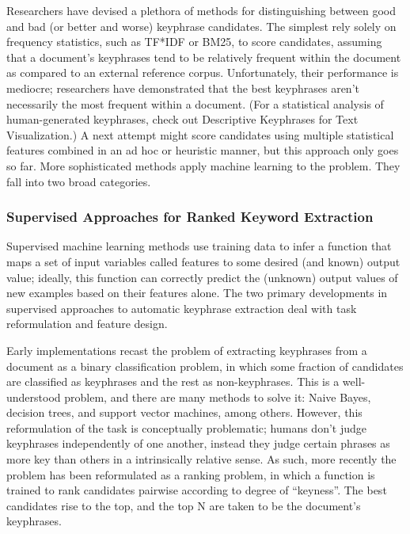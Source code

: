 \documentclass[conference]{IEEEtran}
\begin{document}
Researchers have devised a plethora of methods for distinguishing between good and bad (or better and worse) keyphrase candidates. The simplest rely solely on frequency statistics, such as TF*IDF or BM25, to score candidates, assuming that a document’s keyphrases tend to be relatively frequent within the document as compared to an external reference corpus. Unfortunately, their performance is mediocre; researchers have demonstrated that the best keyphrases aren’t necessarily the most frequent within a document. (For a statistical analysis of human-generated keyphrases, check out Descriptive Keyphrases for Text Visualization.) A next attempt might score candidates using multiple statistical features combined in an ad hoc or heuristic manner, but this approach only goes so far. More sophisticated methods apply machine learning to the problem. They fall into two broad categories.

\subsubsection{Supervised Approaches for Ranked Keyword Extraction\label{supervised-review}}
Supervised machine learning methods use training data to infer a function that maps a set of input variables called features to some desired (and known) output value; ideally, this function can correctly predict the (unknown) output values of new examples based on their features alone. The two primary developments in supervised approaches to automatic keyphrase extraction deal with task reformulation and feature design.

Early implementations recast the problem of extracting keyphrases from a document as a binary classification problem, in which some fraction of candidates are classified as keyphrases and the rest as non-keyphrases. This is a well-understood problem, and there are many methods to solve it: Naive Bayes, decision trees, and support vector machines, among others. However, this reformulation of the task is conceptually problematic; humans don’t judge keyphrases independently of one another, instead they judge certain phrases as more key than others in a intrinsically relative sense. As such, more recently the problem has been reformulated as a ranking problem, in which a function is trained to rank candidates pairwise according to degree of “keyness”. The best candidates rise to the top, and the top N are taken to be the document’s keyphrases.
\end{document}
